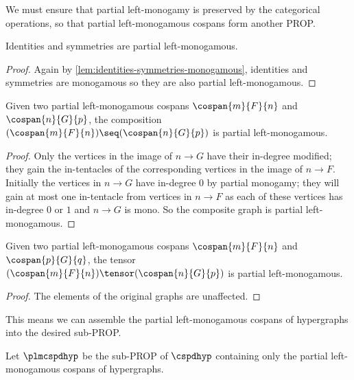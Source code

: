 We must ensure that partial left-monogamy is preserved by the categorical
operations, so that partial left-monogamous cospans form another PROP.

\begin{lemma}\label{lem:partial-monogamous-id-sym}
    Identities and symmetries are partial left-monogamous.
\end{lemma}
\begin{proof}
    Again by \cref{lem:identities-symmetries-monogamous}, identities and
    symmetries are monogamous so they are also partial left-monogamous.
\end{proof}

\begin{lemma}
    Given two partial left-monogamous cospans
    \(\cospan{m}{F}{n}\) and
    \(\cospan{n}{G}{p}\), the composition \(
    (\cospan{m}{F}{n})
    \seq
    (\cospan{n}{G}{p})
    \) is partial left-monogamous.
\end{lemma}
\begin{proof}
    Only the vertices in the image of \(n \to G\) have their in-degree modified;
    they gain the in-tentacles of the corresponding vertices in the image of
    \(n \to F\).
    Initially the vertices in \(n \to G\) have in-degree \(0\) by partial
    monogamy; they will gain at most one in-tentacle from vertices in
    \(n \to F\) as each of these vertices has in-degree \(0\) or \(1\) and
    \(n \to G\) is mono.
    So the composite graph is partial left-monogamous.
\end{proof}

\begin{lemma}
    Given two partial left-monogamous cospans \(\cospan{m}{F}{n}\)
    and \(\cospan{p}{G}{q}\), the tensor \(
    (\cospan{m}{F}{n})
    \tensor
    (\cospan{n}{G}{p})
    \) is partial left-monogamous.
\end{lemma}
\begin{proof}
    The elements of the original graphs are unaffected.
\end{proof}

This means we can assemble the partial left-monogamous cospans of hypergraphs
into the desired sub-PROP.

\begin{definition}
    Let \(\plmcspdhyp\) be the sub-PROP of \(\cspdhyp\) containing only the
    partial left-monogamous cospans of hypergraphs.
\end{definition}

